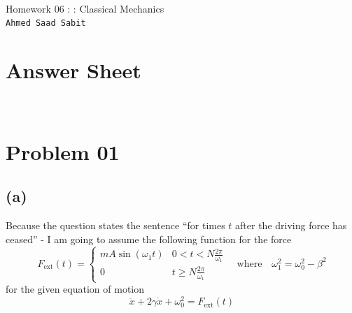 \documentclass[10pts, letterpaper]{article}
\begin{document}
\pagestyle{fancy}
\fancyhead{} %
\fancyhead[C]{\rightmark}
\fancyfoot{}
\renewcommand{\footrulewidth}{0.4pt}

\newlength\adder
\setlength\adder{1cm}
\addtolength\headwidth{2\adder}
\fancyheadoffset{\adder}

\fancyfoot[C]{\vspace{0.3cm}\\ \thepage}

\allowdisplaybreaks

\begin{center}
\ 
	\vspace{1cm} 

	\Huge{\textsf{Homework 06 : : Classical Mechanics}}
	\\
	\vspace{1cm}
	\Large{\texttt{Ahmed Saad Sabit}}
	\vspace{1.5cm} 
\end{center}
{\flushright
\section*{Answer Sheet} 
}
\newpage
\ 


\section*{Problem 01} 
\subsection*{(a)}

Because the question states the sentence ``for times $t$ after the driving force has ceased'' - I am going to assume the following function for the force
\[
F_\text{ext} (t) =
\begin{cases}
	mA \sin(\omega_1 t) & 0 < t < N \frac{2 \pi }{\omega_1} 
	\\
	0 & t \ge N \frac{2 \pi }{\omega_1}
\end{cases}
\quad 
\text{where} \quad \omega_1 ^2 = \omega_0^2 - \beta^2
\]
for the given equation of motion 
\[
\ddot{x} + 2 \gamma \dot{x} + \omega_0^2 = F_\text{ext}(t)
\] 
\end{document}
